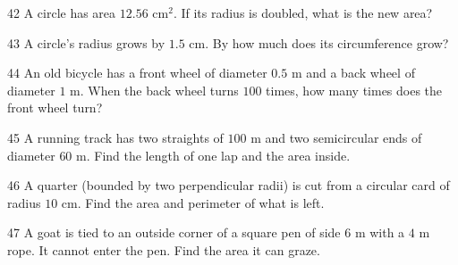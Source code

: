 \gap
\begin{probbox}{42}{}
A circle has area $12.56$ cm$^2$. If its radius is doubled, what is the new area?
\end{probbox}
\gap
\begin{probbox}{43}{}
A circle's radius grows by $1.5$ cm. By how much does its circumference grow?
\end{probbox}
\gap
\begin{probbox}{44}{}
An old bicycle has a front wheel of diameter $0.5$ m and a back wheel of diameter $1$ m. When the back wheel turns $100$ times, how many times does the front wheel turn?
\end{probbox}
\gap
\begin{probbox}{45}{}
A running track has two straights of $100$ m and two semicircular ends of diameter $60$ m. Find the length of one lap and the area inside.
\end{probbox}
\gap
\begin{probbox}{46}{}
A quarter (bounded by two perpendicular radii) is cut from a circular card of radius $10$ cm. Find the area and perimeter of what is left.
\end{probbox}
\gap
\begin{probbox}{47}{}
A goat is tied to an outside corner of a square pen of side $6$ m with a $4$ m rope. It cannot enter the pen. Find the area it can graze.
\end{probbox}
